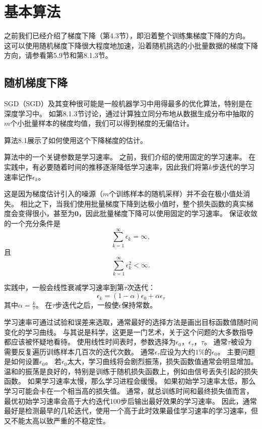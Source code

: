 
\section{基本算法}
\label{sec:basic_algorithms}
之前我们已经介绍了梯度下降（第4.3节），即沿着整个训练集梯度下降的方向。
这可以使用随机梯度下降很大程度地加速，沿着随机挑选的小批量数据的梯度下降方向，请参看第5.9节和第8.1.3节。

\subsection{随机梯度下降}
\label{sec:stochastic_gradient_descent_chap8}
\gls{SGD}（SGD）及其变种很可能是一般机器学习中用得最多的优化算法，特别是在深度学习中。
如第8.1.3节讨论，通过计算独立同分布地从数据生成分布中抽取的$m$个小批量样本的梯度均值，我们可以得到梯度的无偏估计。

算法8.1展示了如何使用这个下降梯度的估计。

算法中的一个关键参数是学习速率。
之前，我们介绍的使用固定的学习速率。
在实践中，有必要随着时间的推移逐渐降低学习速率，因此我们将第$k$步迭代的学习速率记作$\epsilon_k$。

这是因为梯度估计引入的噪源（$m$个训练样本的随机采样）并不会在极小值处消失。
相比之下，当我们使用批量梯度下降到达极小值时，整个损失函数的真实梯度会变得很小，甚至为$\mathbf{0}$，因此批量梯度下降可以使用固定的学习速率。
保证收敛的一个充分条件是
\begin{equation}
\label{eq:8.12}
    \sum_{k=1}^\infty \epsilon_k = \infty,
\end{equation}
且
\begin{equation}
\label{eq:8.13}
    \sum_{k=1}^\infty \epsilon_k^2 < \infty.
\end{equation}


实践中，一般会线性衰减学习速率到第$\tau$次迭代：
\begin{equation}
\label{eq:8.14}
    \epsilon_k = (1-\alpha) \epsilon_0 + \alpha \epsilon_\tau
\end{equation}
其中$\alpha = \frac{k}{\tau}$。
在$\tau$步迭代之后，一般使$\epsilon$保持常数。

学习速率可通过试验和误差来选取，通常最好的选择方法是画出目标函数值随时间变化的学习曲线。
与其说是科学，这更是一门艺术，关于这个问题的大多数指导都应该被怀疑地看待。
使用线性时间表时，参数选择为$\epsilon_0$，$\epsilon_\tau$，$\tau$。  
通常$\tau$被设为需要反复遍历训练样本几百次的迭代次数。
通常$\epsilon_\tau$应设为大约$1\%$的$\epsilon_0$。
主要问题是如何设置$\epsilon_0$。
若$\epsilon_0$太大，学习曲线将会剧烈振荡，损失函数值通常会明显增加。
温和的振荡是良好的，特别是训练于随机损失函数上，例如由信号丢失引起的损失函数。
如果学习速率太慢，那么学习进程会缓慢。
如果初始学习速率太低，那么学习可能会卡在一个相当高的损失值。
通常，就总训练时间和最终损失值而言，最优初始学习速率会高于大约迭代100步后输出最好效果的学习速率。
因此，通常最好是检测最早的几轮迭代，使用一个高于此时效果最佳学习速率的学习速率，但又不能太高以致严重的不稳定性。  

